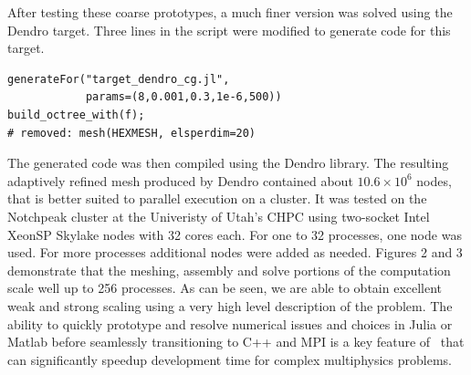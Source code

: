 \documentclass[twoside,leqno,twocolumn]{article}
\begin{document}
After testing these coarse prototypes, a much finer version was solved using the Dendro target. Three lines in the script were modified to generate code for this target. 
\begin{verbatim}
generateFor("target_dendro_cg.jl", 
            params=(8,0.001,0.3,1e-6,500))
build_octree_with(f);
# removed: mesh(HEXMESH, elsperdim=20)
\end{verbatim}
The generated code was then compiled using the Dendro library. The resulting adaptively refined mesh produced by Dendro contained about $10.6\times 10^{6}$ nodes, that is better suited to parallel execution on a cluster. It was tested on the Notchpeak cluster at the Univeristy of Utah's CHPC using two-socket Intel XeonSP Skylake nodes with 32 cores each. For one to 32 processes, one node was used. For more processes additional nodes were added as needed. Figures 2 and 3 demonstrate that the meshing, assembly and solve portions of the computation scale well up to 256 processes. 
As can be seen, we are able to obtain excellent weak and strong scaling using a very high level description of the problem. The ability to quickly prototype and resolve numerical issues and choices in Julia or Matlab before seamlessly transitioning to C++ and MPI is a key feature of \FMshop\ that can significantly speedup development time for complex multiphysics problems. 
\end{document}

